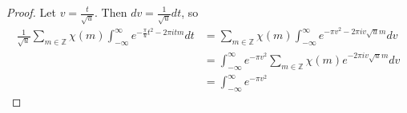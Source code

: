 \documentclass[reqno]{amsart}
\theoremstyle{definition}
\theoremstyle{remark}
\begin{document}
\begin{proof}
    
    Let
    $v = \frac{t}{\sqrt{u} }$. Then
    $dv = \frac{1}{\sqrt{u} } dt$, so
    \begin{align*}
        \frac{1}{\sqrt{u} }
        \sum_{m \in \mathbb{Z}}\chi(m)
        \int_{-\infty}^{\infty} 
        e^{- \frac{\pi}{u} t^2 - 2 \pi i t m}dt
        &= \sum_{m \in \mathbb{Z}}
        \chi(m) \int_{-\infty}^{\infty} 
        e^{-\pi v^2 - 2 \pi i v \sqrt{u} m} dv\\
        &= \int_{-\infty}^{\infty} 
        e^{- \pi v^2} \sum_{m \in \mathbb{Z}}
        \chi(m) e^{-2 \pi i v \sqrt{u}  m} dv\\
        &= \int_{-\infty}^{\infty} e^{- \pi v^2}
    \end{align*}








\end{proof}



\end{document}
